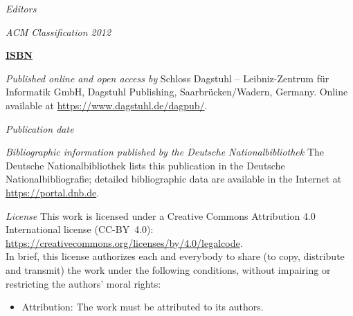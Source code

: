 \documentclass[a4paper,UKenglish]{oasicsmaster-v2021}
\begin{document}
\frontmatter


\maketitle


\begin{publicationinfo}%
\sffamily

\emph{Editors} 
\printEditorLong


\bigskip
\bigskip
\emph{ACM Classification 2012}\\
\printSubjclass

\bigskip
\bigskip

{\Large\bfseries\sffamily \href{https://www.dagstuhl.de/dagpub/\printISBN}{ISBN \printISBN}}

\bigskip
\bigskip

\emph{Published online and open access by}\newline
Schloss Dagstuhl -- Leibniz-Zentrum f\"ur Informatik GmbH, Dagstuhl Publishing, Saarbr\"ucken/Wadern, Germany. Online available at \href{https://www.dagstuhl.de/dagpub/\printISBN}{https://www.dagstuhl.de/dagpub/\printISBN}.

\bigskip
\emph{Publication date}\newline
\printDatePublished

\bigskip
\bigskip

\emph{Bibliographic information published by the Deutsche Nationalbibliothek}\newline
The Deutsche Nationalbibliothek lists this publication in the Deutsche Nationalbibliografie; detailed bibliographic data are available in the Internet at \href{https://portal.dnb.de}{https://portal.dnb.de}. 

\bigskip

\emph{License}\newline
This work is licensed under a Creative Commons Attribution 4.0 International license (CC-BY~4.0):\\ \href{https://creativecommons.org/licenses/by/4.0/legalcode}{https://creativecommons.org/licenses/by/4.0/legalcode}.\\
In brief, this license authorizes each and everybody to share (to copy, distribute and transmit) the work under the following conditions, without impairing or restricting the authors' moral rights:
\begin{itemize}
\item Attribution: The work must be attributed to its authors.
\end{itemize}


\end{publicationinfo}
\end{document}
